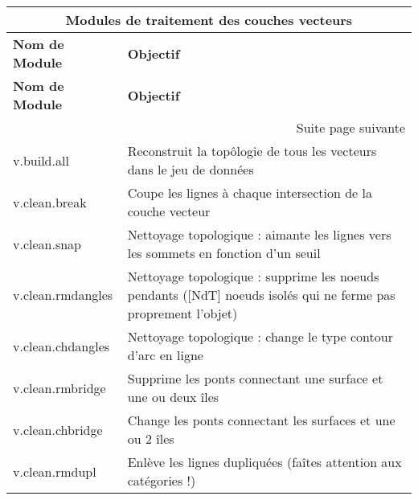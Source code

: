 \begin{center}
{\setlength{\extrarowheight}{10pt}
\small
\begin{longtable}{|p{2.5cm}|p{11.5cm}|}
\hline \multicolumn{2}{|c|}{\textbf{Modules de traitement des couches vecteurs}} \\
\hline \textbf{Nom de Module}&\textbf{Objectif}\\
\endfirsthead
\hline \textbf{Nom de Module}&\textbf{Objectif}\\
\endhead
\hline \multicolumn{2}{|r|}{{Suite page suivante}} \\ \hline
\endfoot
\endlastfoot
  \hline v.build.all & Reconstruit la top\^ologie de tous les vecteurs dans le jeu de données\\
  \hline v.clean.break & Coupe les lignes à chaque intersection de la couche vecteur\\
  \hline v.clean.snap & Nettoyage topologique : aimante les lignes vers les sommets en fonction d'un seuil\\
  \hline v.clean.rmdangles & Nettoyage topologique : supprime les noeuds pendants ([NdT] noeuds isolés qui ne ferme pas proprement l'objet) \\
  \hline v.clean.chdangles & Nettoyage topologique : change le type contour d'arc en ligne \\
  \hline v.clean.rmbridge & Supprime les ponts connectant une surface et une ou deux îles\\
  \hline v.clean.chbridge & Change les ponts connectant les surfaces et une ou 2 îles \\
  \hline v.clean.rmdupl & Enlève les lignes dupliquées  (faîtes attention aux catégories !) \\

\end{longtable}}
\end{center}
